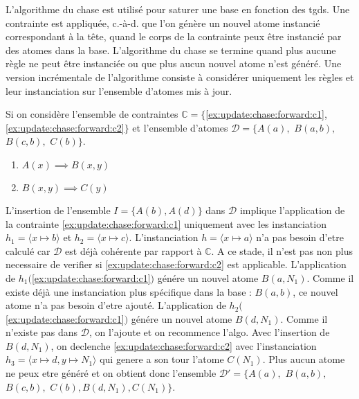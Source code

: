 L'algorithme du \gls{chase} \cite{ahoTheoryJoinsRelational1979,maierTestingImplicationsData1979} est utilisé pour saturer une base en fonction des \glspl{tgd}.
Une contrainte est appliquée, c.-à-d. que l'on génère un nouvel atome instancié correspondant à la tête, quand le corps de la contrainte peux être instancié par des atomes dans la base.
L'algorithme du \gls{chase} se termine quand plus aucune règle ne peut être instanciée ou que plus aucun nouvel atome n'est généré.
Une version incrémentale de l'algorithme consiste à considérer uniquement les règles et leur instanciation sur l'ensemble d'atomes mis à jour.

\begin{example}
    \label{ex:update:chase:forward}
    Si on considère l'ensemble de contraintes $\mathbb{C} = \{$\ref{ex:update:chase:forward:c1}, \ref{ex:update:chase:forward:c2}$\}$ et l'ensemble d'atomes $\mathcal{D} = \{A(a),$ $B(a, b),$ $B(c, b),$ $C(b)\}$.
    \begin{enumerate}[label=\textbf{$c_\arabic*$ :},ref=$c_\arabic*$]
        \item $A(x) \implies B(x, y)$ \label{ex:update:chase:forward:c1}
        \item $B(x, y) \implies C(y)$ \label{ex:update:chase:forward:c2}
    \end{enumerate}

    L'insertion de l'ensemble $I = \{A(b), A(d)\}$ dans $\mathcal{D}$ implique l'application de la contrainte \ref{ex:update:chase:forward:c1} uniquement avec les instanciation $h_1 = \langle x \mapsto b \rangle$ et $h_2 = \langle x \mapsto c \rangle$.
    L'instanciation $h = \langle x \mapsto a \rangle$ n'a pas besoin d'etre calculé car $\mathcal{D}$ est déjà cohérente par rapport à $\mathbb{C}$.
    A ce stade, il n'est pas non plus necessaire de verifier si \ref{ex:update:chase:forward:c2} est applicable.
    L'application de $h_1($\ref{ex:update:chase:forward:c1}$)$ génére un nouvel atome $B(a, N_1)$.
    Comme il existe déjà une instanciation plus spécifique dans la base : $B(a, b)$, ce nouvel atome n'a pas besoin d'etre ajouté.
    L'application de $h_2($\ref{ex:update:chase:forward:c1}$)$ génére un nouvel atome $B(d, N_1)$.
    Comme il n'existe pas dans $\mathcal{D}$, on l'ajoute et on recommence l'algo.
    Avec l'insertion de $B(d, N_1)$, on declenche \ref{ex:update:chase:forward:c2} avec l'instanciation $h_3 = \langle x \mapsto d, y \mapsto N_1 \rangle$ qui genere a son tour l'atome $C(N_1)$.
    Plus aucun atome ne peux etre généré et on obtient donc l'ensemble $\mathcal{D}' = \{A(a),$ $B(a, b),$ $B(c, b),$ $C(b), B(d, N_1), C(N_1)\}$.
\end{example}

